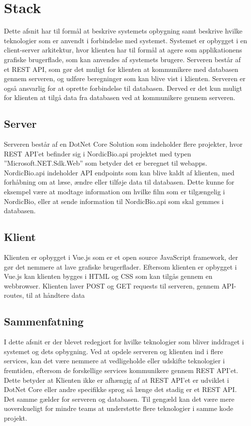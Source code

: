 \section{Stack}
Dette afsnit har til formål at beskrive systemets opbygning samt beskrive hvilke teknologier som er anvendt i forbindelse med systemet. 
Systemet er opbygget i en client-server arkitektur, hvor klienten har til formål at agere som applikationens grafiske 
brugerflade, som kan anvendes af systemets brugere. Serveren består af et REST API, som gør det muligt for klienten 
at kommunikere med databasen gennem serveren, og udføre beregninger som kan blive vist i klienten. Serveren er også 
ansvarlig for at oprette forbindelse til databasen. Derved er det kun muligt for klienten at tilgå data fra databasen 
ved at kommunikere gennem serveren.\\

\subsection{Server}
Serveren består af en DotNet Core Solution som indeholder flere projekter, hvor REST API’et befinder sig i NordicBio.api 
projektet med typen ”Microsoft.NET.Sdk.Web” som betyder det er beregnet til webapps. 
NordicBio.api indeholder API endpoints som kan blive kaldt af klienten, med forhåbning om at læse, ændre eller tilføje data til databasen. 
Dette kunne for eksempel være at modtage information om hvilke film som er tilgængelig i NordicBio, eller at sende information til 
NordicBio.api som skal gemmes i databasen.\\

\subsection{Klient}
Klienten er opbygget i Vue.js som er et open source JavaScript framework, der gør det nemmere at lave grafiske 
brugerflader. Eftersom klienten er opbygget i Vue.js kan klienten bygges i HTML og CSS som kan tilgås 
gennem en webbrowser. Klienten laver POST og GET requests til serveren, gennem API-routes, til at håndtere data\\

\subsection{Sammenfatning}
I dette afsnit er der blevet redegjort for hvilke teknologier som bliver inddraget i systemet og dets opbygning. 
Ved at opdele serveren og klienten ind i flere services, kan det være nemmere at vedligeholde eller udskifte teknologier 
i fremtiden, eftersom de forskellige services kommunikere gennem REST API’et. 
Dette betyder at Klienten ikke er afhængig af at REST API’et er udviklet i DotNet Core eller andre specifikke sprog så 
længe det stadig er et REST API. Det samme gælder for serveren og databasen. Til gengæld kan det være mere uoverskueligt 
for mindre teams at understøtte flere teknologier i samme kode projekt. 


